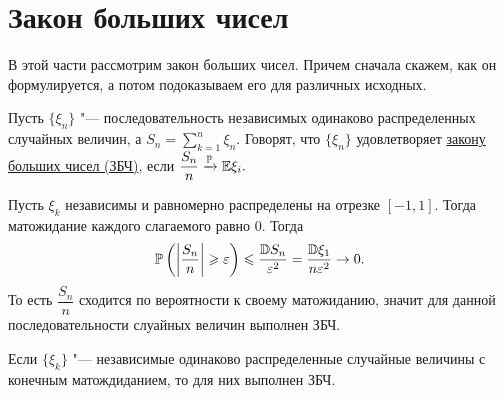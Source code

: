 \documentclass[../TV&MS.tex]{subfiles}
\begin{document}
    
\section{Закон больших чисел}
В этой части рассмотрим закон больших чисел. Причем сначала скажем, как он формулируется, а потом подоказываем его для различных исходных.

\begin{Def}
    Пусть $\{\xi_n\}$ "--- последовательность независимых одинаково распределенных случайных величин, а $S_n = \sum\limits_{k=1}^{n} \xi_n$.
    Говорят, что $\{\xi_n\}$ удовлетворяет \uline{закону больших чисел (ЗБЧ)}, если $\dfrac{S_n}{n} \xrightarrow[]{\mathbb{P}} \mathbb{E} \xi_i.$ 
\end{Def} 

\begin{Ex}
    Пусть $\xi_k$ независимы и равномерно распределены на отрезке $[-1, 1]$. Тогда матожидание каждого слагаемого равно $0$. Тогда
    \[
        \mathbb{P} \left( \left| \dfrac{S_n}{n} \right| \geqslant \varepsilon \right) \leqslant \dfrac{\mathbb{D} S_n}{\varepsilon^2} = \dfrac{\mathbb{D} \xi_1}{n \varepsilon^2} \rightarrow 0 
    .\]
    То есть $\dfrac{S_n}{n}$ сходится по вероятности к своему матожиданию, значит для данной последовательности слуайных величин выполнен ЗБЧ.
\end{Ex} 

\begin{Th}
    Если $\{ \xi_k \}$ "--- независимые одинаково распределенные случайные величины с конечным матождиданием, то для них выполнен ЗБЧ. 
\end{Th} 
\end{document}
